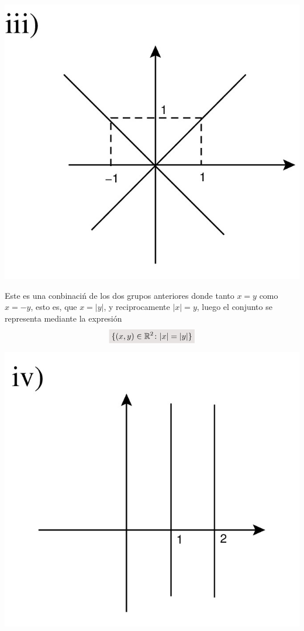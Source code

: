 \documentclass[a4paper,11pt]{article}
\newcommand{\real}{\mathbb{R}}
\newcommand{\resalta}[1]{\colorbox{g}{$\displaystyle #1$}}
\begin{document}
\begin{enumerate}
\begin{enumerate}[label = \roman*)]
\begin{minipage}[c]{0.3\linewidth}
                    \includegraphics[scale=0.15]{4ii-3}
            \end{minipage}
            \begin{minipage}[c]{0.7\linewidth}
                Este es una conbinaci\'n de los dos grupos anteriores donde tanto $x=y$ como $x=-y$, esto es, que $x=|y|$, y reciprocamente $|x|=y$, luego el conjunto se representa mediante la expresi\'on
                \begin{equation}
                    \notag \resalta{\{(x,y)\in \real^{2} \colon |x|=|y|\}}
                \end{equation}
            \end{minipage}
            \begin{minipage}[c]{0.3\linewidth}
                \centering
                    \includegraphics[scale=0.15]{4ii-4}

\end{minipage}
\end{enumerate}
\end{enumerate}
\end{document}
